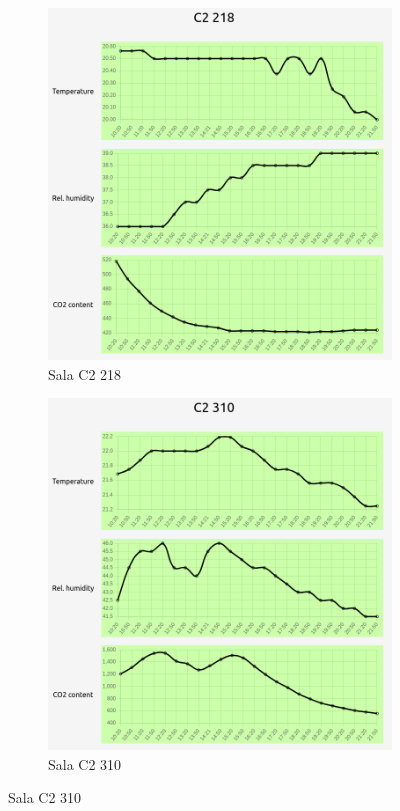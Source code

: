 \begin{figure}[H]
    \begin{subfigure}{0.5\textwidth}
        \centering
        \includegraphics[width=\linewidth]{zdj/app/readings-c2218.png}
        \caption{Sala C2 218}
    \end{subfigure}
    \begin{subfigure}{0.5\textwidth}
        \centering
        \includegraphics[width=\linewidth]{zdj/app/readings-c2310.png}
        \caption{Sala C2 310}
    \end{subfigure}
\end{figure}

